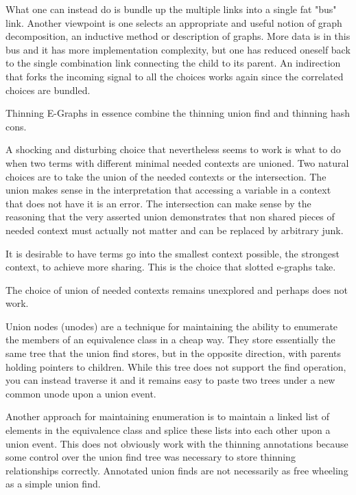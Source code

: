 \documentclass{article}%
\begin{document}
What one can instead do is bundle up the multiple links into a single fat "bus" link. Another viewpoint is one selects an appropriate and useful notion of graph decomposition, an inductive method or description of graphs. More data is in this bus and it has more implementation complexity, but one has reduced oneself back to the single combination link connecting the child to its parent. An indirection that forks the incoming signal to all the choices works again since the correlated choices are bundled.

Thinning E-Graphs in essence combine the thinning union find and thinning hash cons.



A shocking and disturbing choice that nevertheless seems to work is what to do when two terms with different minimal needed contexts are unioned. Two natural choices are to take the union of the needed contexts or the intersection. The union makes sense in the interpretation that accessing a variable in a context that does not have it is an error. The intersection can make sense by the reasoning that the very asserted union demonstrates that non shared pieces of needed context must actually not matter and can be replaced by arbitrary junk.

It is desirable to have terms go into the smallest context possible, the strongest context, to achieve more sharing. This is the choice that slotted e-graphs take.

The choice of union of needed contexts remains unexplored and perhaps does not work.


Union nodes (unodes) \cite{aegraphs} are a technique for maintaining the ability to enumerate the members of an equivalence class in a cheap way. They store essentially the same tree that the union find stores, but in the opposite direction, with parents holding pointers to children. While this tree does not support the find operation, you can instead traverse it and it remains easy to paste two trees under a new common unode upon a union event.

Another approach for maintaining enumeration is to maintain a linked list of elements in the equivalence class and splice these lists into each other upon a union event. This does not obviously work with the thinning annotations because some control over the union find tree was necessary to store thinning relationships correctly. Annotated union finds are not necessarily as free wheeling as a simple union find.
\end{document}
